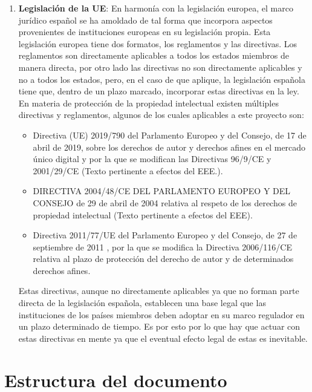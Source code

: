 \begin{enumerate}
    \item \textbf{Legislación de la UE}: En harmonía con la legislación
    europea, el marco jurídico español se ha amoldado de tal forma que incorpora
    aspectos provenientes de instituciones europeas en su legislación propia.
    Esta legislación europea tiene dos formatos, los reglamentos y las
    directivas. Los reglamentos son directamente aplicables a todos los estados
    miembros de manera directa, por otro lado las directivas no son directamente
    aplicables y no a todos los estados, pero, en el caso de que aplique, la
    legislación española tiene que, dentro de un plazo marcado, incorporar estas
    directivas en la ley. En materia de protección de la propiedad intelectual
    existen múltiples directivas y reglamentos, algunos de los cuales aplicables
    a este proyecto son:
    \begin{itemize}
        \item Directiva (UE) 2019/790 del Parlamento Europeo y del Consejo, de
        17 de abril de 2019, sobre los derechos de autor y derechos afines en el
        mercado único digital y por la que se modifican las Directivas 96/9/CE y
        2001/29/CE (Texto pertinente a efectos del EEE.). \cite{EU1}
        \item DIRECTIVA 2004/48/CE DEL PARLAMENTO EUROPEO Y DEL CONSEJO de 29 de
        abril de 2004 relativa al respeto de los derechos de propiedad
        intelectual (Texto pertinente a efectos del EEE). \cite{EU2}
        \item Directiva 2011/77/UE del Parlamento Europeo y del Consejo, de 27
        de septiembre de 2011 , por la que se modifica la Directiva 2006/116/CE
        relativa al plazo de protección del derecho de autor y de determinados
        derechos afines. \cite{EU3}
    \end{itemize}
    Estas directivas, aunque no directamente aplicables ya que no forman parte
    directa de la legislación española, establecen una base legal que las
    instituciones de los países miembros deben adoptar en su marco regulador en
    un plazo determinado de tiempo. Es por esto por lo que hay que actuar con
    estas directivas en mente ya que el eventual efecto legal de estas es
    inevitable.
\end{enumerate}

\section{Estructura del documento}

